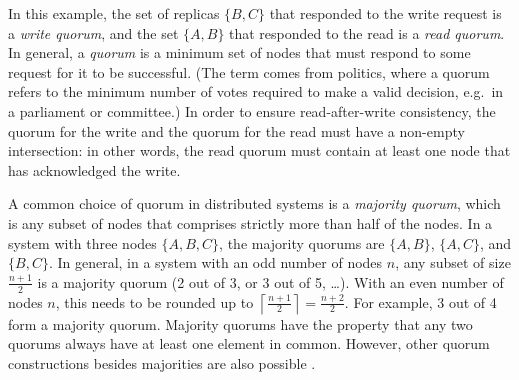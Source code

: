 In this example, the set of replicas $\{B, C\}$ that responded to the write request is a \emph{write quorum}, and the set $\{A, B\}$ that responded to the read is a \emph{read quorum}.
In general, a \emph{quorum} is a minimum set of nodes that must respond to some request for it to be successful.
(The term comes from politics, where a quorum refers to the minimum number of votes required to make a valid decision, e.g.\ in a parliament or committee.)
In order to ensure read-after-write consistency, the quorum for the write and the quorum for the read must have a non-empty intersection: in other words, the read quorum must contain at least one node that has acknowledged the write.

A common choice of quorum in distributed systems is a \emph{majority quorum}, which is any subset of nodes that comprises strictly more than half of the nodes.
In a system with three nodes $\{A,B,C\}$, the majority quorums are $\{A,B\}$, $\{A,C\}$, and $\{B,C\}$.
In general, in a system with an odd number of nodes $n$, any subset of size $\frac{n+1}{2}$ is a majority quorum (2 out of 3, or 3 out of 5, \dots).
With an even number of nodes $n$, this needs to be rounded up to $\left\lceil\frac{n+1}{2}\right\rceil = \frac{n+2}{2}$.
For example, 3 out of 4 form a majority quorum.
Majority quorums have the property that any two quorums always have at least one element in common.
However, other quorum constructions besides majorities are also possible \citep{Whittaker:2021}.

